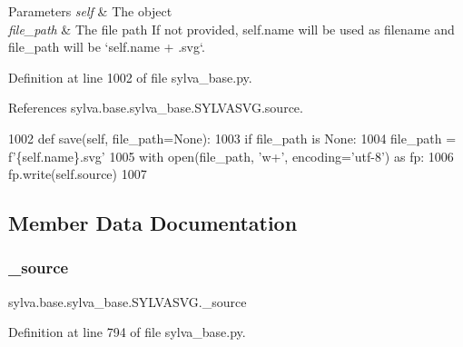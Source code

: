 \begin{DoxyParams}{Parameters}
{\em self} & The object \\
\hline
{\em file\+\_\+path} & The file path If not provided, {\ttfamily self.\+name} will be used as filename and {\ttfamily file\+\_\+path} will be `self.name + \textquotesingle{}.svg\textquotesingle{}`. \\
\hline
\end{DoxyParams}


Definition at line 1002 of file sylva\+\_\+base.\+py.



References sylva.\+base.\+sylva\+\_\+base.\+S\+Y\+L\+V\+A\+S\+V\+G.\+source.


\begin{DoxyCode}
1002     \textcolor{keyword}{def }save(self, file\_path=None):
1003         \textcolor{keywordflow}{if} file\_path \textcolor{keywordflow}{is} \textcolor{keywordtype}{None}:
1004             file\_path = f\textcolor{stringliteral}{'\{self.name\}.svg'}
1005         with open(file\_path, \textcolor{stringliteral}{'w+'}, encoding=\textcolor{stringliteral}{'utf-8'}) \textcolor{keyword}{as} fp:
1006             fp.write(self.source)
1007 \end{DoxyCode}


\subsection{Member Data Documentation}
\mbox{\label{classsylva_1_1base_1_1sylva__base_1_1_s_y_l_v_a_s_v_g_a313167adc69d8d8a40f447cb293d6988}} 
\subsubsection{\texorpdfstring{\+\_\+source}{\_source}}
{\footnotesize\ttfamily sylva.\+base.\+sylva\+\_\+base.\+S\+Y\+L\+V\+A\+S\+V\+G.\+\_\+source\hspace{0.3cm}{\ttfamily [private]}}



Definition at line 794 of file sylva\+\_\+base.\+py.



